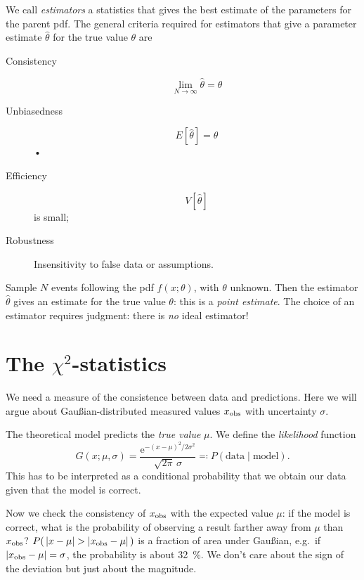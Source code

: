 \documentclass[
	10pt,
	draft
]{scrreprt}
\newcommand{\eu}{\ensuremath{\mathrm{e}}}
\begin{document}
We call \emph{estimators} a statistics that gives the best estimate of the parameters for the parent \ac{pdf}.
The general criteria required for estimators that give a parameter estimate $\hat\theta$ for the true value $\theta$ are
\begin{description}
	\item[Consistency]
\begin{equation}
\lim_{N\to\infty}\hat\theta = \theta
\end{equation}
	\item[Unbiasedness]
\begin{equation}
E[\hat\theta] = \theta
\end{equation}•
	\item[Efficiency]
\begin{equation}
V[\hat\theta]
\end{equation}
is small;
	\item[Robustness] Insensitivity to false data or assumptions.
\end{description}



Sample $N$ events following the \ac{pdf} $f(x;\theta)$, with $\theta$ unknown.
Then the estimator $\hat\theta$ gives an estimate for the true value $\theta$: this is a \emph{point estimate}.
The choice of an estimator requires judgment: there is \emph{no} ideal estimator!

	\section{The $\chi^2$-statistics}

We need a measure of the consistence between data and predictions.
Here we will argue about Gau\ss{}ian-distributed measured values $x_\textup{obs}$ with uncertainty $\sigma$.


The theoretical model predicts the \emph{true value} $\mu$.
We define the \emph{likelihood} function
\begin{equation}
G(x; \mu, \sigma) = \frac{\eu^{-(x-\mu)^2\!/2\sigma^2} }{\sqrt{2\pi}\,\sigma} \eqqcolon P( \text{data}\mid\text{model}).
\end{equation}
This has to be interpreted as a conditional probability that we obtain our data given that the model is correct.


Now we check the consistency of $x_\textup{obs}$ with the expected value $\mu$: if the model is correct, what is the probability of observing a result farther away from $\mu$ than $x_\textup{obs}$?
$P( \,\lvert x - \mu\rvert > \lvert x_\textup{obs}-\mu\rvert \, )$ is a fraction of area under Gau\ss{}ian, e.g.~if $\lvert x_\textup{obs} - \mu\rvert = \sigma$, the probability is about \SI{32}{\percent}.
We don't care about the sign of the deviation but just about the magnitude.
\end{document}
